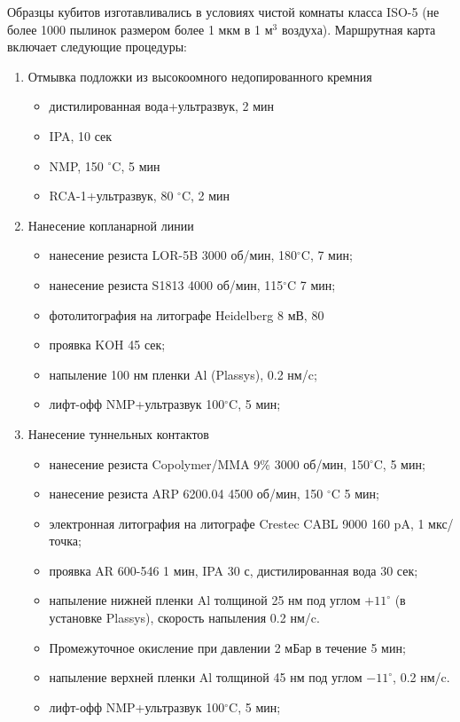 Образцы кубитов изготавливались в условиях чистой комнаты класса ISO-5 (не более 1000 пылинок размером более 1 мкм в 1 м$^3$ воздуха). Маршрутная карта включает следующие процедуры:
\begin{enumerate}
	\item Отмывка подложки из высокоомного недопированного кремния 
	\begin{itemize}
	  \item дистилированная вода+ультразвук, 2 мин
	  \item IPA, 10 сек
	  \item NMP, 150 $^\circ$C, 5 мин
	  \item RCA-1+ультразвук, 80 $^\circ$C, 2 мин 
	\end{itemize}
	\item Нанесение копланарной линии
	\begin{itemize}
		\item нанесение резиста LOR-5B 3000 об/мин, 180$^\circ$C, 7 мин;
		\item нанесение резиста S1813 4000 об/мин, 115$^\circ$C 7 мин;
		\item фотолитография на литографе Heidelberg 8 мВ, 80%
		\item проявка KOH 45 сек;
		\item напыление 100 нм пленки Al (Plassys), 0.2 нм/c; 
		\item лифт-офф NMP+ультразвук 100$^\circ$C, 5 мин;
	\end{itemize}
	\item Нанесение туннельных контактов
		\begin{itemize}
			\item нанесение резиста Copolymer/MMA 9\% 3000 об/мин, 150$^\circ$C, 5 мин;
			\item нанесение резиста ARP 6200.04 4500 об/мин, 150 $^\circ$C 5 мин;
			\item электронная литография на литографе Crestec CABL 9000 160 pA, 1 мкс/точка;
			\item проявка AR 600-546 1 мин, IPA 30 с, дистилированная вода 30 сек;
			\item напыление нижней пленки Al толщиной 25 нм под углом $+11^\circ$ (в установке Plassys), скорость напыления 0.2 нм/c.
			\item Промежуточное окисление при давлении 2 мБар в течение 5 мин; 
			\item напыление верхней пленки Al толщиной 45 нм под углом $-11^\circ$, 0.2 нм/c.
			\item лифт-офф NMP+ультразвук 100$^\circ$C, 5 мин;
		\end{itemize}
\end{enumerate}

